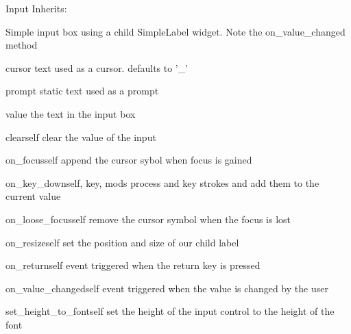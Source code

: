 \begin{classdesc*}{Input}
Inherits:

Simple input box using a child SimpleLabel widget. 
Note the on\_value\_changed method

\begin{memberdesc}{cursor}
text used as a cursor. defaults to '_'
\end{memberdesc}

\begin{memberdesc}{prompt}
static text used as a prompt
\end{memberdesc}

\begin{memberdesc}{value}
the text in the input box
\end{memberdesc}

\begin{methoddesc}{clear}{self}
clear the value of the input
\end{methoddesc}

\begin{methoddesc}{on_focus}{self}
append the cursor sybol when focus is gained
\end{methoddesc}

\begin{methoddesc}{on_key_down}{self, key, mods}
process and key strokes and add them to the current value
\end{methoddesc}

\begin{methoddesc}{on_loose_focus}{self}
remove the cursor symbol when the focus is lost
\end{methoddesc}

\begin{methoddesc}{on_resize}{self}
set the position and size of our child label
\end{methoddesc}

\begin{methoddesc}{on_return}{self}
event triggered when the return key is pressed
\end{methoddesc}

\begin{methoddesc}{on_value_changed}{self}
event triggered when the value is changed by the user
\end{methoddesc}

\begin{methoddesc}{set_height_to_font}{self}
set the height of the input control to the height of the font
\end{methoddesc}

\end{classdesc*}

